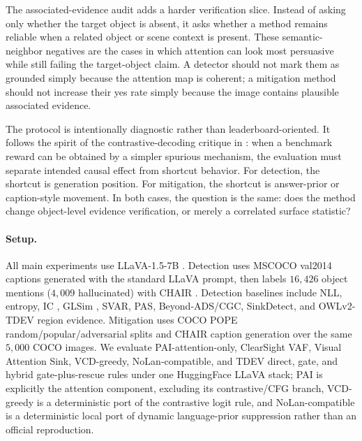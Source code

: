 The associated-evidence audit adds a harder verification slice. Instead of asking only whether the target object is absent, it asks whether a method remains reliable when a related object or scene context is present. These semantic-neighbor negatives are the cases in which attention can look most persuasive while still failing the target-object claim. A detector should not mark them as grounded simply because the attention map is coherent; a mitigation method should not increase their yes rate simply because the image contains plausible associated evidence.

The protocol is intentionally diagnostic rather than leaderboard-oriented. It follows the spirit of the contrastive-decoding critique in \citet{yin2025mirage}: when a benchmark reward can be obtained by a simpler spurious mechanism, the evaluation must separate intended causal effect from shortcut behavior. For detection, the shortcut is generation position. For mitigation, the shortcut is answer-prior or caption-style movement. In both cases, the question is the same: does the method change object-level evidence verification, or merely a correlated surface statistic?

\paragraph{Setup.} All main experiments use LLaVA-1.5-7B \cite{liu2023llava}. Detection uses MSCOCO val2014 \cite{lin2014coco} captions generated with the standard LLaVA prompt, then labels $16{,}426$ object mentions ($4{,}009$ hallucinated) with CHAIR \cite{rohrbach2018chair}. Detection baselines include NLL, entropy, IC \cite{jiang2024interpreting}, GLSim \cite{park2025glsim}, SVAR, PAS, Beyond-ADS/CGC, SinkDetect, and OWLv2-TDEV region evidence. Mitigation uses COCO POPE random/popular/adversarial splits and CHAIR caption generation over the same $5{,}000$ COCO images. We evaluate PAI-attention-only, ClearSight VAF, Visual Attention Sink, VCD-greedy, NoLan-compatible, and TDEV direct, gate, and hybrid gate-plus-rescue rules under one HuggingFace LLaVA stack; PAI is explicitly the attention component, excluding its contrastive/CFG branch, VCD-greedy is a deterministic port of the contrastive logit rule, and NoLan-compatible is a deterministic local port of dynamic language-prior suppression rather than an official reproduction.
